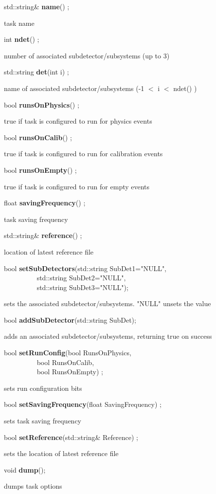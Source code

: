 \item    std::string\& {\bf name}() ;

 task name


\item    int {\bf ndet}() ;

 number of associated subdetector/subsystems (up to 3)


\item    std::string {\bf det}(int i) ;

 name of associated subdetector/subsystems (-1 $<$ i $<$ ndet() )


\item    bool {\bf runsOnPhysics}() ;

 true if task is configured to run for physics events


\item    bool {\bf runsOnCalib}() ;

 true if task is configured to run for calibration events


\item    bool {\bf runsOnEmpty}() ;

 true if task is configured to run for empty events


\item    float {\bf savingFrequency}() ;

 task saving frequency


\item    std::string\& {\bf reference}() ;

 location of latest reference file


\item    bool {\bf setSubDetectors}(std::string SubDet1="NULL",\\\mbox{}~~~~~~~~~ 
			std::string SubDet2="NULL",\\\mbox{}~~~~~~~~~ 
			std::string SubDet3="NULL");

 sets the associated subdetector/subsystems. "NULL" unsets the value 


\item    bool {\bf addSubDetector}(std::string SubDet);


 adds an associated subdetector/subsystems, returning true on success


\item    bool {\bf setRunConfig}(bool RunsOnPhysics,\\\mbox{}~~~~~~~~~ 
		    bool RunsOnCalib,\\\mbox{}~~~~~~~~~ 
		    bool RunsOnEmpty) ;

 sets run configuration bits


\item    bool {\bf setSavingFrequency}(float SavingFrequency) ;

 sets task saving frequency


\item    bool {\bf setReference}(std::string\& Reference) ;

 sets the location of latest reference file


\item    void {\bf dump}();


 dumps task options


